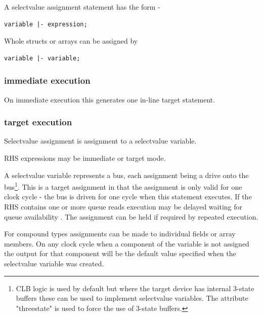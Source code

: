         A selectvalue assignment statement has the form -
        \begin{lstlisting}[gobble=8, language=threepl]
               variable |- expression;
        \end{lstlisting}
        
        Whole structs or arrays can be assigned by
        \begin{lstlisting}[gobble=8, language=threepl]
               variable |- variable;
        \end{lstlisting}

        \subsubsection{immediate execution}
        
            On immediate execution this generates one in-line target
            statement.
        
        \subsubsection{target execution}
        
            Selectvalue assignment is assignment to a selectvalue variable.

            RHS expressions may be immediate or target mode.

            A selectvalue variable represents a bus, each assignment being a
            drive onto the bus\footnote{CLB logic is used by default but where
            the target device has internal 3-state buffers these can be used to
            implement selectvalue variables. The attribute "threestate" is used
            to force the use of 3-state buffers.}. This is a target assignment
            in that the assignment is only valid for one clock cycle - the bus
            is driven for one cycle when this statement executes. If the RHS
            contains one or more queue reads execution may be delayed waiting for
            queue availability . The assignment can be
            held if required by repeated execution.
            
            For compound types assignments can be made to individual fields
            or array members. On any clock cycle when a component of the
            variable is not assigned the output for that component will be
            the default value specified when the selectvalue variable was
            created.
        
